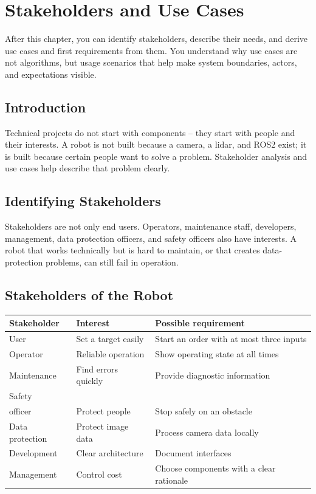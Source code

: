 \chapter{Stakeholders and Use Cases}

\begin{lernziele}
After this chapter, you can identify stakeholders, describe their needs, and derive use cases and first requirements from them. You understand why use cases are not algorithms, but usage scenarios that help make system boundaries, actors, and expectations visible.
\end{lernziele}

\section{Introduction}
Technical projects do not start with components -- they start with people and their interests. A robot is not built because a camera, a lidar, and ROS2 exist; it is built because certain people want to solve a problem. Stakeholder analysis and use cases help describe that problem clearly.

\section{Identifying Stakeholders}
Stakeholders are not only end users. Operators, maintenance staff, developers, management, data protection officers, and safety officers also have interests. A robot that works technically but is hard to maintain, or that creates data-protection problems, can still fail in operation.

\section{Stakeholders of the Robot}
\begin{longtable}{p{}p{}p{}}
\toprule
Stakeholder & Interest & Possible requirement\\
\midrule
User & Set a target easily & Start an order with at most three inputs\\
Operator & Reliable operation & Show operating state at all times\\
Maintenance & Find errors quickly & Provide diagnostic information\\
Safety\\officer & Protect people & Stop safely on an obstacle\\
Data protection & Protect image data & Process camera data locally\\
Development & Clear architecture & Document interfaces\\
Management & Control cost & Choose components with a clear rationale\\
\bottomrule
\end{longtable}

